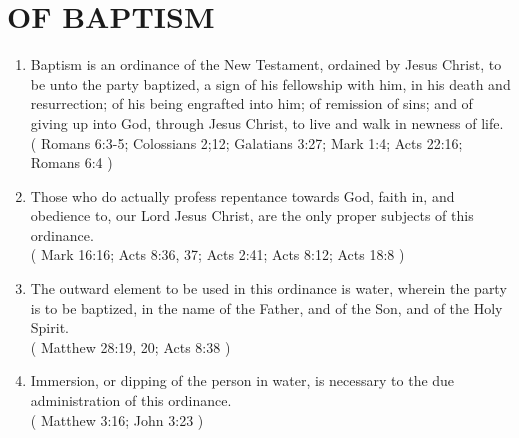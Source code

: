 \documentclass[12pt,a4paper]{book}
\begin{document}
\chapter{OF BAPTISM}
\label{ch-bapm}
\begin{enumerate}
\item Baptism is an ordinance of the New Testament, ordained by Jesus Christ, to be unto the party baptized, a sign of his fellowship with him, in his death and resurrection; of his being engrafted into him; of remission of sins; and of giving up into God, through Jesus Christ, to live and walk in newness of life.\\
( Romans 6:3-5; Colossians 2;12; Galatians 3:27; Mark 1:4; Acts 22:16; Romans 6:4 )
\item Those who do actually profess repentance towards God, faith in, and obedience to, our Lord Jesus Christ, are the only proper subjects of this ordinance.\\
( Mark 16:16; Acts 8:36, 37; Acts 2:41; Acts 8:12; Acts 18:8 )
\item The outward element to be used in this ordinance is water, wherein the party is to be baptized, in the name of the Father, and of the Son, and of the Holy Spirit.\\
( Matthew 28:19, 20; Acts 8:38 )
\item Immersion, or dipping of the person in water, is necessary to the due administration of this ordinance.\\
( Matthew 3:16; John 3:23 )
\end{enumerate}
\end{document}
